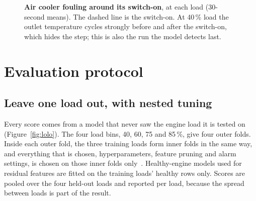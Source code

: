 \documentclass[10pt]{article}
\begin{document}
\begin{figure}[!htbp]
\centering
{}
\caption{\textbf{Air cooler fouling around its switch-on}, at each load (30-second means). The dashed line is the switch-on. At 40\,\% load the outlet temperature cycles strongly before and after the switch-on, which hides the step; this is also the run the model detects last.}
\label{fig:switchon}
\end{figure}

\section{Evaluation protocol}
\label{sec:protocol}

\subsection{Leave one load out, with nested tuning}

Every score comes from a model that never saw the engine load it is tested on (Figure~\ref{fig:lolo}). The four load bins, 40, 60, 75 and 85\,\%, give four outer folds. Inside each outer fold, the three training loads form inner folds in the same way, and everything that is chosen, hyperparameters, feature pruning and alarm settings, is chosen on those inner folds only~\cite{varma2006bias}. Healthy-engine models used for residual features are fitted on the training loads' healthy rows only. Scores are pooled over the four held-out loads and reported per load, because the spread between loads is part of the result.
\end{document}
